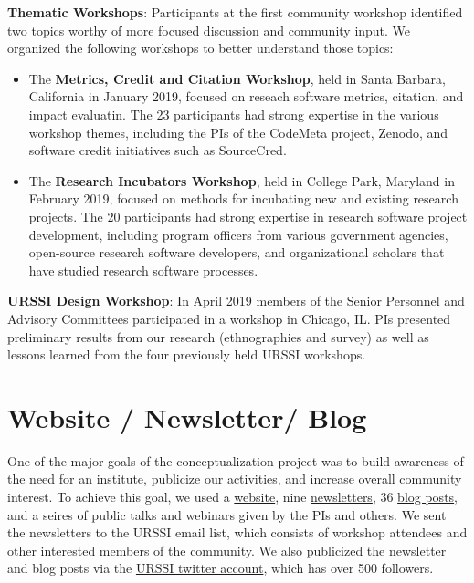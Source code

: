 \documentclass[
]{book}
\begin{document}
\textbf{Thematic Workshops}: Participants at the first community workshop identified
two topics worthy of more focused discussion and community input.
We organized the following workshops to better understand those topics:

\begin{itemize}
\item
  The \textbf{Metrics, Credit and Citation Workshop}, held in Santa Barbara,
  California in January 2019, focused on reseach software metrics, citation,
  and impact evaluatin. The 23 participants had strong expertise in the
  various workshop themes, including the PIs of the CodeMeta project, Zenodo,
  and software credit initiatives such as SourceCred.
\item
  The \textbf{Research Incubators Workshop}, held in College Park, Maryland
  in February 2019, focused on methods for incubating new and existing research projects.
  The 20 participants had strong expertise in
  research software project development, including program officers from
  various government agencies, open-source research software developers,
  and organizational scholars that have studied research software processes.
\end{itemize}

\textbf{URSSI Design Workshop}: In April 2019 members of the Senior Personnel
and Advisory Committees participated in a workshop in Chicago, IL. PIs
presented preliminary results from our research (ethnographies and survey)
as well as lessons learned from the four previously held URSSI workshops.

\hypertarget{website-newsletter-blog}{%
\section{Website / Newsletter/ Blog}\label{website-newsletter-blog}}

One of the major goals of the conceptualization project was to build awareness
of the need for an institute, publicize our activities, and increase overall community interest.
To achieve this goal, we used a \href{http://urssi.us}{website}, nine \href{http://urssi.us/newsletter/}{newsletters},
36 \href{http://urssi.us/blog/}{blog posts}, and a seires of public talks and webinars given
by the PIs and others. We sent the newsletters to the URSSI email list, which consists
of workshop attendees and other interested members of the community.
We also publicized the newsletter and blog posts via the \href{https://twitter.com/si2urssi/}{URSSI twitter account},
which has over 500 followers.
\end{document}
